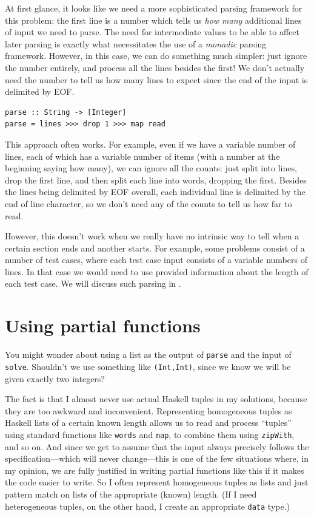 \documentclass{book}
\newcommand{\pref}[1]{\prettyref{#1}}
\newcommand{\h}[1]{\texttt{#1}}
\begin{document}
At first glance, it looks like we need a more sophisticated parsing
framework for this problem: the first line is a number which tells us
\emph{how many} additional lines of input we need to parse.  The need
for intermediate values to be able to affect later parsing is exactly
what necessitates the use of a \emph{monadic} parsing framework.
However, in this case, we can do something much simpler: just ignore
the number entirely, and process all the lines besides the first!  We
don't actually need the number to tell us how many lines to expect
since the end of the input is delimited by EOF.

\begin{verbatim}
parse :: String -> [Integer]
parse = lines >>> drop 1 >>> map read
\end{verbatim}

This approach often works. For example, even if we have a variable
number of lines, each of which has a variable number of items (with a
number at the beginning saying how many), we can ignore all the
counts: just split into lines, drop the first line, and then split
each line into words, dropping the first.  Besides the lines being
delimited by EOF overall, each individual line is delimited by the end
of line character, so we don't need any of the counts to tell us how
far to read.

However, this doesn't work when we really have no intrinsic way to
tell when a certain section ends and another starts.  For example,
some problems consist of a number of test cases, where each test case
input consists of a variable numbers of lines. In that case we would
need to use provided information about the length of each test case.
We will discuss such parsing in \pref{chap:parsing}.


\section{Using partial functions}
\label{sec:partial}

You might wonder about using a list as the output of \h{parse} and the
input of \h{solve}.  Shouldn't we use something like \h{(Int,Int)}, since
we know we will be given exactly two integers? 

The fact is that I almost never use actual Haskell tuples in my
solutions, because they are too awkward and inconvenient. Representing
homogeneous tuples as Haskell lists of a certain known length allows
us to read and process ``tuples'' using standard functions like
\h{words} and \h{map}, to combine them using \h{zipWith}, and so on.
And since we get to assume that the input always precisely follows the
specification---which will never change---this is one of the few
situations where, in my opinion, we are fully justified in writing
partial functions like this if it makes the code easier to write.  So
I often represent homogeneous tuples as lists and just pattern match
on lists of the appropriate (known) length.  (If I need heterogeneous
tuples, on the other hand, I create an appropriate \h{data} type.)
\end{document}
